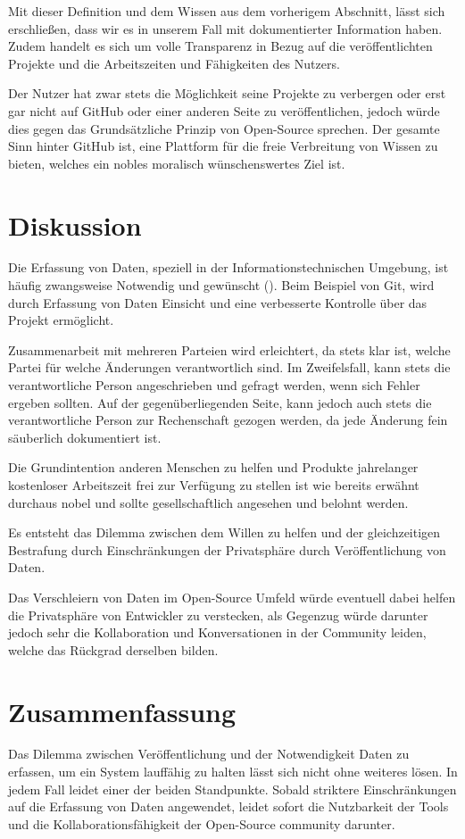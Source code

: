 \documentclass[12pt,a4paper]{article}
\begin{document}
Mit dieser Definition und dem Wissen aus dem vorherigem Abschnitt, lässt sich erschließen, dass wir es in unserem Fall mit dokumentierter Information haben.
Zudem handelt es sich um volle Transparenz in Bezug auf die veröffentlichten Projekte und die Arbeitszeiten und Fähigkeiten des Nutzers.

Der Nutzer hat zwar stets die Möglichkeit seine Projekte zu verbergen oder erst gar nicht auf GitHub oder einer anderen Seite zu veröffentlichen, jedoch würde dies gegen das Grundsätzliche Prinzip von Open-Source sprechen.
Der gesamte Sinn hinter GitHub ist, eine Plattform für die freie Verbreitung von Wissen zu bieten, welches ein nobles moralisch wünschenswertes Ziel ist.


\section{Diskussion}

Die Erfassung von Daten, speziell in der Informationstechnischen Umgebung, ist häufig zwangsweise Notwendig und gewünscht (\cite[p.~6]{article:seeing-knowing}).
Beim Beispiel von Git, wird durch Erfassung von Daten Einsicht und eine verbesserte Kontrolle über das Projekt ermöglicht.

Zusammenarbeit mit mehreren Parteien wird erleichtert, da stets klar ist, welche Partei für welche Änderungen verantwortlich sind.
Im Zweifelsfall, kann stets die verantwortliche Person angeschrieben und gefragt werden, wenn sich Fehler ergeben sollten.
Auf der gegenüberliegenden Seite, kann jedoch auch stets die verantwortliche Person zur Rechenschaft gezogen werden, da jede Änderung fein säuberlich dokumentiert ist.

Die Grundintention anderen Menschen zu helfen und Produkte jahrelanger kostenloser Arbeitszeit frei zur Verfügung zu stellen ist wie bereits erwähnt durchaus nobel und sollte gesellschaftlich angesehen und belohnt werden.

Es entsteht das Dilemma zwischen dem Willen zu helfen und der gleichzeitigen Bestrafung durch Einschränkungen der Privatsphäre durch Veröffentlichung von Daten.

Das Verschleiern von Daten im Open-Source Umfeld würde eventuell dabei helfen die Privatsphäre von Entwickler zu verstecken, als Gegenzug würde darunter jedoch sehr die Kollaboration und Konversationen in der Community leiden, welche das Rückgrad derselben bilden.

\section{Zusammenfassung}
Das Dilemma zwischen Veröffentlichung und der Notwendigkeit Daten zu erfassen, um ein System lauffähig zu halten lässt sich nicht ohne weiteres lösen.
In jedem Fall leidet einer der beiden Standpunkte.
Sobald striktere Einschränkungen auf die Erfassung von Daten angewendet, leidet sofort die Nutzbarkeit der Tools und die Kollaborationsfähigkeit der Open-Source community darunter.
\end{document}
